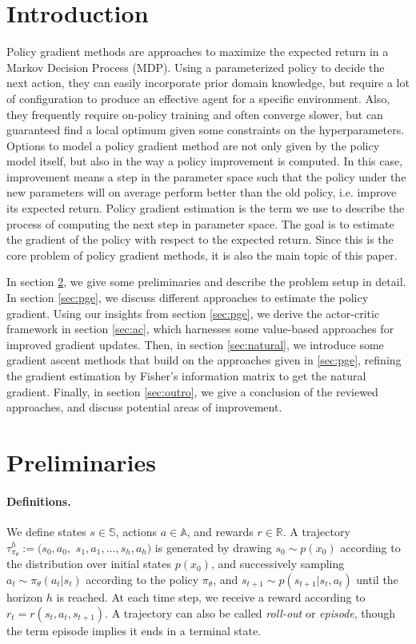 \section{Introduction}
\label{intro}

Policy gradient methods are approaches to maximize the expected return in a Markov Decision Process (MDP). Using a parameterized policy to decide the next action, they can easily incorporate prior domain knowledge, but require a lot of configuration to produce an effective agent for a specific environment. Also, they frequently require on-policy training and often converge slower, but can guaranteed find a local optimum given some constraints on the hyperparameters. Options to model a policy gradient method are not only given by the policy model itself, but also in the way a policy improvement is computed. \cite{DBLP:journals/corr/SchulmanMLJA15} In this case, improvement means a step in the parameter space such that the policy under the new parameters will on average perform better than the old policy, i.e. improve its expected return. Policy gradient estimation is the term we use to describe the process of computing the next step in parameter space. The goal is to estimate the gradient of the policy with respect to the expected return. Since this is the core problem of policy gradient methods, it is also the main topic of this paper.

In section \ref{sec:prel}, we give some preliminaries and describe the problem setup in detail. In section \ref{sec:pge}, we discuss different approaches to estimate the policy gradient. Using our insights from section \ref{sec:pge}, we derive the actor-critic framework in section \ref{sec:ac}, which harnesses some value-based approaches for improved gradient updates. Then, in section \ref{sec:natural}, we introduce some gradient ascent methods that build on the approaches given in \ref{sec:pge}, refining the gradient estimation by Fisher's information matrix to get the natural gradient. Finally, in section \ref{sec:outro}, we give a conclusion of the reviewed approaches, and discuss potential areas of improvement.

\section{Preliminaries}
\label{sec:prel}

\paragraph{Definitions.} We define states $s \in \mathbb{S}$, actions $a \in \mathbb{A}$, and rewards $r \in \mathbb{R}$. A trajectory $\tau_{\pi_\theta}^h := (s_0, a_0, $ $s_1, a_1, \dots, s_h, a_h)$ is generated by drawing $s_0 \sim p(x_0)$ according to the distribution over initial states $p(x_0)$, and successively sampling $a_t \sim \pi_\theta(a_t|s_t)$ according to the policy $\pi_\theta$, and $s_{t+1} \sim p(s_{t+1}|s_t,a_t)$ until the horizon $h$ is reached. At each time step, we receive a reward according to $r_t = r(s_t, a_t, s_{t+1})$. A trajectory can also be called \textit{roll-out} or \textit{episode}, though the term episode implies it ends in a terminal state.

